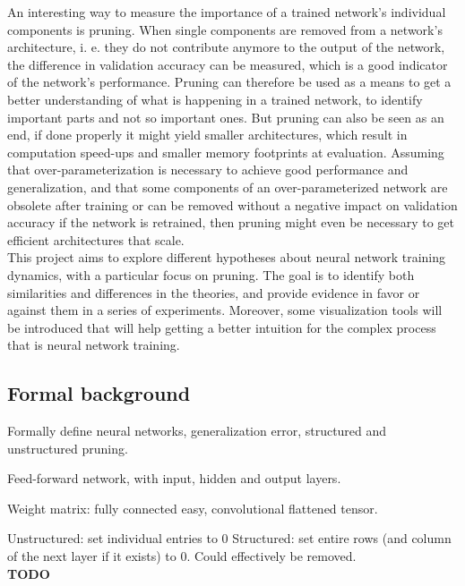 An interesting way to measure the importance of a trained network's individual components is pruning. When single components are removed from a network's architecture, i. e. they do not contribute anymore to the output of the network, the difference in validation accuracy can be measured, which is a good indicator of the network's performance. Pruning can therefore be used as a means to get a better understanding of what is happening in a trained network, to identify important parts and not so important ones. But pruning can also be seen as an end, if done properly it might yield smaller architectures, which result in computation speed-ups and smaller memory footprints at evaluation. Assuming that over-parameterization is necessary to achieve good performance and generalization, and that some components of an over-parameterized network are obsolete after training or can be removed without a negative impact on validation accuracy if the network is retrained, then pruning might even be necessary to get efficient architectures that scale. \\

This project aims to explore different hypotheses about neural network training dynamics, with a particular focus on pruning. The goal is to identify both similarities and differences in the theories, and provide evidence in favor or against them in a series of experiments. Moreover, some visualization tools will be introduced that will help getting a better intuition for the complex process that is neural network training.

\subsection{Formal background}

Formally define neural networks, generalization error, structured and unstructured pruning. 

Feed-forward network, with input, hidden and output layers.

Weight matrix: fully connected easy, convolutional flattened tensor.

Unstructured: set individual entries to 0
Structured: set entire rows (and column of the next layer if it exists) to 0. Could effectively be removed. \\

\textbf{TODO}

